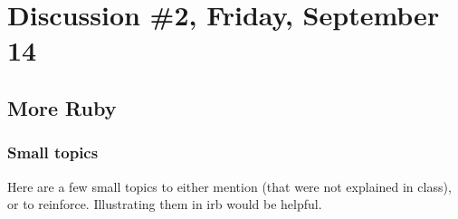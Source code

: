 \documentclass[12pt]{article}
\begin{document}

  \section{Discussion \#2, Friday, September 14}

    \subsection{More Ruby}
  
      \subsubsection{Small topics}
  
        Here are a few small topics to either mention (that were not explained
      in class), or to reinforce.  Illustrating them in irb would be
      helpful.
  
        \vspace{-1.5mm}
  
\end{document}
